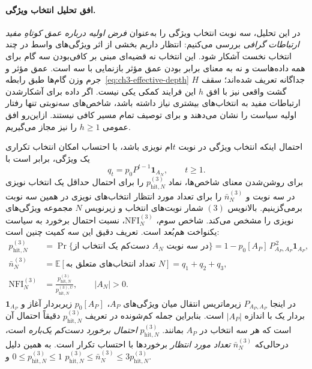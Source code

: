 \paragraph{افق تحلیل انتخاب ویژگی.}
در این تحلیل، سه نوبت انتخاب ویژگی را
به‌عنوان \emph{فرض اولیه درباره عمق کوتاهِ مفید
ارتباطات گرافی} بررسی می‌کنیم: انتظار داریم
بخشی از اثر ویژگی‌های واسط در چند انتخاب نخست
آشکار شود. این انتخاب نه قضیه‌ای مبنی بر کافی‌بودن
سه گام برای همه داده‌هاست و نه به معنای برابر بودن
عمق مؤثر بازنمایی با سه است. عمق مؤثر و جرم
وزن گام‌ها طبق رابطه~\eqref{eq:ch3-effective-depth}
جداگانه تعریف شده‌اند؛ سقف $H$ گشت واقعی نیز
با افق $h$ این فرایند کمکی یکی نیست.
اگر داده برای آشکارشدن ارتباطات مفید به
انتخاب‌های بیشتری نیاز داشته باشد،
شاخص‌های سه‌نوبتی تنها رفتار اولیه سیاست را
نشان می‌دهند و برای توصیف تمام مسیر کافی نیستند.
ازاین‌رو افق عمومی $h\ge1$ را نیز مجاز می‌گیریم.

احتمال اینکه انتخاب ویژگی در نوبت $t$ام نویزی باشد،
با احتساب امکان انتخاب تکراری یک ویژگی، برابر است با
\begin{equation}\label{eq:ch3-noise-qt}
q_t=p_0P^{t-1}\mathbf 1_{A_N},\qquad t\ge1.
\end{equation}
برای روشن‌شدن معنای شاخص‌ها، نماد
$p_{\mathrm{hit},N}^{(3)}$ را برای احتمال حداقل
یک انتخاب نویزی در سه نوبت و
$\bar n_N^{(3)}$ را برای تعداد مورد انتظار
انتخاب‌های نویزی در همین سه نوبت برمی‌گزینیم.
بالانویس $(3)$ شمار نوبت‌های انتخاب و زیرنویس $N$
مجموعه ویژگی‌های نویزی را مشخص می‌کند.
شاخص سوم، $\mathrm{NFI}_N^{(3)}$،
نسبت احتمال برخورد به سیاست یکنواخت
هم‌بُعد است. تعریف دقیق این سه کمیت چنین است:
\begin{equation}\label{eq:ch3-noise-F3-E3}
\boxed{
\begin{aligned}
p_{\mathrm{hit},N}^{(3)}&=\Pr\{\text{دست‌کم یک انتخاب از }A_N\text{ در سه نوبت}\}
   =1-p_0[A_P]\,P_{A_P,A_P}^{\,2}\mathbf 1_{A_P},\\
\bar n_N^{(3)}&=\mathbb E[\text{تعداد انتخاب‌های متعلق به }N]
   =q_1+q_2+q_3,\\
\mathrm{NFI}_N^{(3)}&=\frac{p_{\mathrm{hit},N}^{(3)}}{p_{\mathrm{hit},N}^{(3),U}},\qquad |A_N|>0.
\end{aligned}}
\end{equation}
در اینجا $P_{A_P,A_P}$ زیرماتریس
انتقال میان ویژگی‌های $A_P$،
$p_0[A_P]$ زیر‌بردار آغاز
و $\mathbf 1_{A_P}$ بردار یک
با اندازه $|A_P|$ است.
بنابراین جمله کم‌شونده در تعریف
$p_{\mathrm{hit},N}^{(3)}$ دقیقاً
احتمال آن است که هر سه انتخاب در $A_P$ بمانند.
$p_{\mathrm{hit},N}^{(3)}$ \emph{احتمال برخورد دست‌کم یک‌باره} است،
درحالی‌که $\bar n_N^{(3)}$ \emph{تعداد مورد انتظار} برخوردها
با احتساب تکرار است. به همین دلیل
$0\le p_{\mathrm{hit},N}^{(3)}\le1$ و
$p_{\mathrm{hit},N}^{(3)}\le\bar n_N^{(3)}
\le3p_{\mathrm{hit},N}^{(3)}$.

